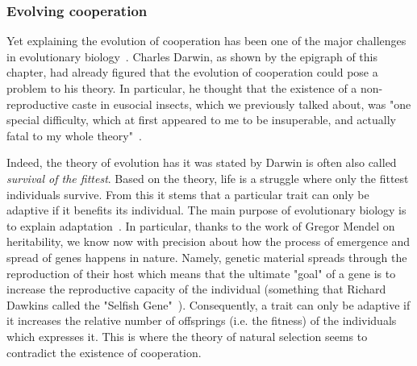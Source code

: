     \subsubsection{Evolving cooperation} Yet explaining the evolution of cooperation has been one of the major challenges in evolutionary biology~\parencite{Hamilton1964, Dugatkin2002, West2011a}. Charles Darwin, as shown by the epigraph of this chapter, had already figured that the evolution of cooperation could pose a problem to his theory. In particular, he thought that the existence of a non-reproductive caste in eusocial insects, which we previously talked about, was "one special difficulty, which at first appeared to me to be insuperable, and actually fatal to my whole theory"~\parencite{Darwin1859}. 

    Indeed, the theory of evolution has it was stated by Darwin is often also called \emph{survival of the fittest}. Based on the theory, life is a struggle where only the fittest individuals survive. From this it stems that a particular trait can only be adaptive if it benefits its individual. The main purpose of evolutionary biology is to explain adaptation~\parencite{West2011a}. In particular, thanks to the work of Gregor Mendel on heritability, we know now with precision about how the process of emergence and spread of genes happens in nature. Namely, genetic material spreads through the reproduction of their host which means that the ultimate "goal" of a gene is to increase the reproductive capacity of the individual (something that Richard Dawkins called the "Selfish Gene"~\parencite{Dawkins1976}). Consequently, a trait can only be adaptive if it increases the relative number of offsprings (i.e. the fitness) of the individuals which expresses it. This is where the theory of natural selection seems to contradict the existence of cooperation. 

